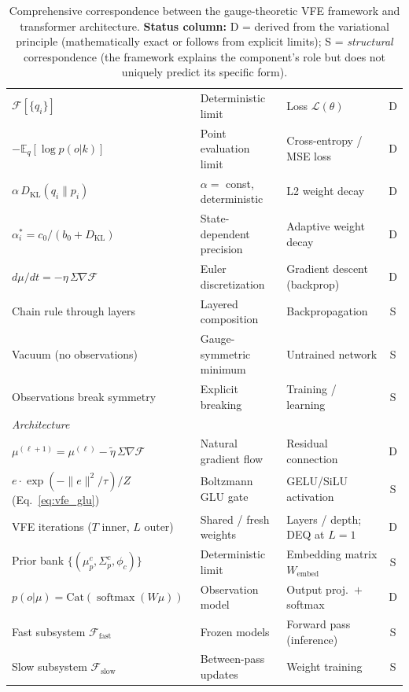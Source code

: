 \documentclass[twoside,11pt]{article}
\newcommand{\softmax}{\operatorname{softmax}}
\newcommand{\KL}{\operatorname{KL}}
\begin{document}
\begin{table}[p]
\begin{tabular}{|l|l|l|c|}
\hline
$\mathcal{F}[\{q_i\}]$ & Deterministic limit & Loss $\mathcal{L}(\theta)$ & D \\
$-\mathbb{E}_q[\log p(o|k)]$ & Point evaluation limit & Cross-entropy / MSE loss & D \\
$\alpha\, D_{\KL}(q_i \| p_i)$ & $\alpha = $ const, deterministic & L2 weight decay & D \\
$\alpha_i^* \!=\! c_0/(b_0 + D_{\KL})$ & State-dependent precision & Adaptive weight decay & D \\
$d\mu/dt = -\eta\,\Sigma\nabla\mathcal{F}$ & Euler discretization & Gradient descent (backprop) & D \\
Chain rule through layers & Layered composition & Backpropagation & S \\
Vacuum (no observations) & Gauge-symmetric minimum & Untrained network & S \\
Observations break symmetry & Explicit breaking & Training / learning & S \\
\hline
\multicolumn{4}{|l|}{\textit{Architecture}} \\
\hline
$\mu^{(\ell+1)} \!=\! \mu^{(\ell)} - \tilde{\eta}\,\Sigma\nabla\mathcal{F}$ & Natural gradient flow & Residual connection & D \\
$e \cdot \exp(-\|e\|^2/\tau)/Z$ (Eq.~\ref{eq:vfe_glu}) & Boltzmann GLU gate & GELU/SiLU activation & S \\
VFE iterations ($T$ inner, $L$ outer) & Shared / fresh weights & Layers / depth; DEQ at $L\!=\!1$ & D \\
Prior bank $\{(\mu_p^c, \Sigma_p^c, \phi_c)\}$ & Deterministic limit & Embedding matrix $W_{\text{embed}}$ & S \\
$p(o|\mu) = \mathrm{Cat}(\softmax(W\mu))$ & Observation model & Output proj.\ $+$ softmax & D \\
Fast subsystem $\mathcal{F}_{\text{fast}}$ & Frozen models & Forward pass (inference) & S \\
Slow subsystem $\mathcal{F}_{\text{slow}}$ & Between-pass updates & Weight training & S \\
\hline
\end{tabular}
\caption{Comprehensive correspondence between the gauge-theoretic VFE framework and transformer architecture. \textbf{Status column:} D = derived from the variational principle (mathematically exact or follows from explicit limits); S = \emph{structural} correspondence (the framework explains the component's role but does not uniquely predict its specific form).}
\label{tab:fep_nn_correspondence}
\end{table}
\end{document}
